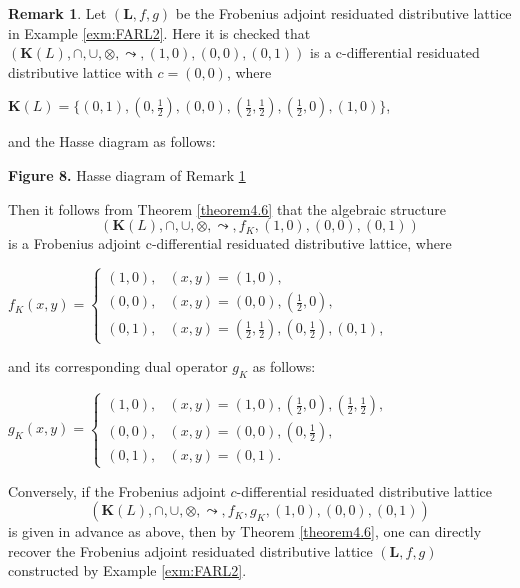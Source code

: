 \documentclass[final,12pt,times]{elsarticle}
\theoremstyle{plain}
\theoremstyle{definition}
\newtheorem{remark}[definition]{Remark}
\theoremstyle{break}
\begin{document}
\begin{remark}\label{example5.9.} Let $(\mathbf{L},f,g)$ be the Frobenius adjoint residuated distributive lattice  in Example \ref{exm:FARL2}. 
Here it is checked that $(\mathbf{K}(L),\cap,\cup,\otimes,\leadsto,(1,0),(0,0),(0,1))$ is a c-differential residuated distributive lattice with $c=(0,0)$, where 
\begin{center} $\mathbf{K}(L)=\{(0,1),(0,\frac{1}{2}),(0,0),(\frac{1}{2},\frac{1}{2}),(\frac{1}{2},0),(1,0)\}$,
\end{center}
 and the Hasse diagram as follows:
\begin{center}
\end{center}
\begin{center} {\bf{Figure 8.}} Hasse diagram of Remark \ref{example5.9.}
\end{center}
Then it follows from Theorem \ref{theorem4.6} that the algebraic structure $$(\mathbf{K}(L),\cap,\cup,\otimes,\leadsto,f_K,(1,0),(0,0),(0,1))$$ is a Frobenius adjoint c-differential residuated distributive lattice, where
\begin{center}
$f_K(x,y)=
\begin{cases}
(1,0), & (x,y)= (1,0),\\
(0,0), & (x,y)= (0,0),(\frac{1}{2},0),\\
(0,1), & (x,y)= (\frac{1}{2},\frac{1}{2}),(0,\frac{1}{2}),(0,1),
\end{cases}$
\end{center}
and its corresponding dual operator $g_K$ as follows:
\begin{center}
$g_K(x,y)=
\begin{cases}
(1,0), & (x,y)= (1,0),(\frac{1}{2},0),(\frac{1}{2},\frac{1}{2}),\\
(0,0), & (x,y)= (0,0),(0,\frac{1}{2}),\\
(0,1), & (x,y)= (0,1).
\end{cases}$
\end{center}

Conversely, if the Frobenius adjoint $c$-differential residuated distributive lattice $$(\mathbf{K}(L),\cap,\cup,\otimes,\leadsto,f_K,g_K,(1,0),(0,0),(0,1))$$ is given in advance as above, then by Theorem \ref{theorem4.6}, one can directly recover the Frobenius adjoint residuated distributive lattice $(\mathbf{L},f,g)$ constructed by Example \ref{exm:FARL2}.
\end{remark}
\end{document}
